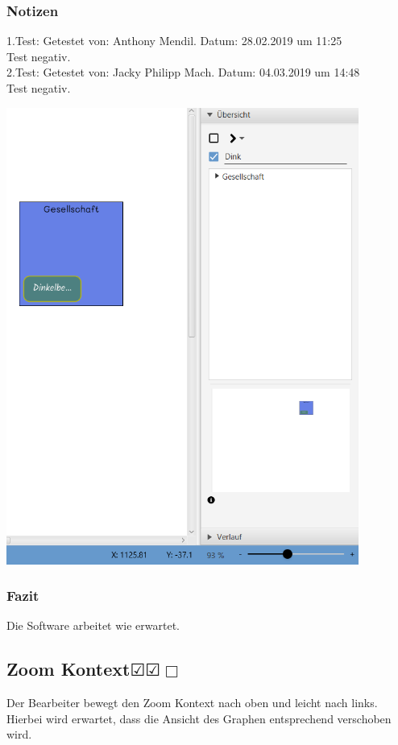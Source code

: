 \documentclass[enabledeprecatedfontcommands]{scrartcl}
\newcommand{\subsectiont}[2]{\subsection[#1]{#1{\normalsize\normalfont #2}}}
\newcommand{\leer}{$\Box$}
\newcommand{\ok}{$\CheckedBox$}
\begin{document}
\subsubsection{Notizen}
1.Test: Getestet von: Anthony Mendil. Datum: 28.02.2019 um 11:25 \\
Test negativ. \\
2.Test: Getestet von: Jacky Philipp Mach. Datum: 04.03.2019 um 14:48 \\
Test negativ.
\begin{center}
\includegraphics[height=15cm]{zoomBar.PNG}
\end{center}
\subsubsection{Fazit}
Die Software arbeitet wie erwartet.

\subsectiont{Zoom Kontext}{\dotfill\ok\ok\leer}
Der Bearbeiter bewegt den Zoom Kontext nach oben und leicht nach links. Hierbei wird erwartet, dass die Ansicht des Graphen entsprechend verschoben wird. 
\end{document}
